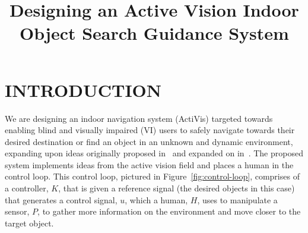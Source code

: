 \documentclass[a4paper, twoside]{article}
\begin{document}
\title{Designing an Active Vision Indoor Object Search Guidance System} 

\author{
}



\onecolumn \maketitle \normalsize \vfill

\section{\uppercase{Introduction}}

\noindent We are designing an indoor navigation system (ActiVis) targeted towards enabling blind and visually impaired (VI) users to safely navigate towards their desired destination or find an object in an unknown and dynamic environment, expanding upon ideas originally proposed in~\cite{bellotto2013} and expanded on in~\cite{lock2017portable}. The proposed system implements ideas from the active vision field and places a human in the control loop. This control loop, pictured in Figure~\ref{fig:control-loop}, comprises of a controller, $K$, that is given a reference signal (the desired objects in this case) that generates a control signal, $u$, which a human, $H$, uses to manipulate a sensor, $P$, to gather more information on the environment and move closer to the target object. %
\end{document}
